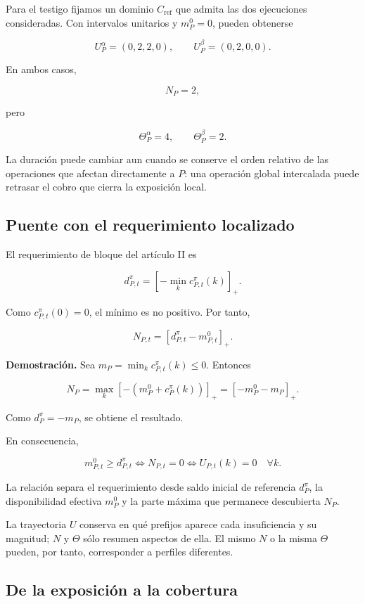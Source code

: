 \documentclass[10pt,a5paper,twoside]{article}
\begin{document}
Para el testigo fijamos un dominio \(C_{\mathrm{ref}}\) que admita las
dos ejecuciones consideradas. Con intervalos unitarios y \(m_P^0=0\),
pueden obtenerse

\[
U^\alpha_P=(0,2,2,0),
\qquad
U^\beta_P=(0,2,0,0).
\]

En ambos casos,

\[
N_P=2,
\]

pero

\[
\Theta^\alpha_P=4,
\qquad
\Theta^\beta_P=2.
\]

La duración puede cambiar aun cuando se conserve el orden relativo de las
operaciones que afectan directamente a \(P\): una operación global
intercalada puede retrasar el cobro que cierra la exposición local.

\subsection{Puente con el requerimiento localizado}\label{puente-con-el-requerimiento-localizado}

El requerimiento de bloque del artículo II es

\[
d^\pi_{P,t}
=
\left[
-\min_k c^\pi_{P,t}(k)
\right]_+.
\]

Como \(c^\pi_{P,t}(0)=0\), el mínimo es no positivo. Por tanto,

\[
N_{P,t}
=
[d^\pi_{P,t}-m^0_{P,t}]_+.
\]

\textbf{Demostración.} Sea \(m_P=\min_k c^\pi_{P,t}(k)\le0\). Entonces

\[
N_P
=
\max_k[-(m^0_P+c^\pi_P(k))]_+
=
[-m^0_P-m_P]_+.
\]

Como \(d^\pi_P=-m_P\), se obtiene el resultado.

En consecuencia,

\[
m^0_{P,t}\ge d^\pi_{P,t}
\iff
N_{P,t}=0
\iff
U_{P,t}(k)=0\quad\forall k.
\]

La relación separa el requerimiento desde saldo inicial de referencia
\(d^\pi_P\), la disponibilidad efectiva \(m^0_P\) y la parte máxima que
permanece descubierta \(N_P\).

La trayectoria \(U\) conserva en qué prefijos aparece cada insuficiencia y su
magnitud; \(N\) y \(\Theta\) sólo resumen aspectos de ella. El mismo \(N\) o
la misma \(\Theta\) pueden, por tanto, corresponder a perfiles diferentes.

\subsection{De la exposición a la cobertura}\label{de-la-exposiciuxf3n-a-la-cobertura}
\end{document}
